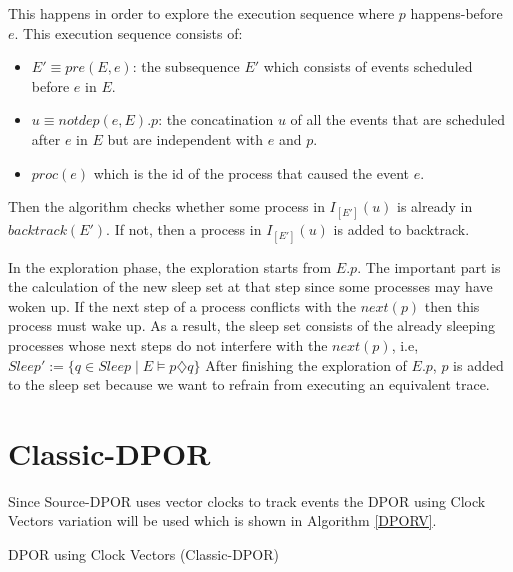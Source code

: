 This happens in order to explore the execution sequence where $p$ happens-before $e$.
This execution sequence consists of:
\begin{itemize} 
\item $E' \equiv pre(E,e)$: the subsequence $E'$ which consists of events scheduled before $e$ in $E$.
\item $u \equiv notdep(e,E).p$: the concatination $u$ of all the events that are scheduled after $e$ in $E$ but are independent with $e$ and $p$.
\item $proc(e)$ which is the id of the process that caused the event $e$.
\end{itemize}
Then the algorithm checks whether some process in $I_{[E']}(u)$ is already in $backtrack(E')$. 
If not, then a process in $I_{[E']}(u)$ is added to backtrack. 

In the exploration phase, the exploration starts from $E.p$. The important part is the calculation of the new sleep set at that step since some processes 
may have woken up.
If the next step of a process conflicts with the $next(p)$ then this process must wake up. As a result, the sleep set consists of the already sleeping processes
whose next steps do not interfere with the $next(p)$, i.e, $Sleep' := \{q \in Sleep \mid E \models p \diamondsuit q \} $ 
After finishing the exploration of $E.p$, $p$ is added to the sleep set because we want to refrain from executing an equivalent trace.

\section{Classic-DPOR}

Since Source-DPOR uses vector clocks to track events the DPOR using Clock Vectors \cite{FlanaganDPOR} variation will be used which is shown in Algorithm \ref{DPORV}.

\begin{algorithm}
    \caption{DPOR using Clock Vectors (Classic-DPOR)}
    \label{DPORV}
\end{algorithm}

